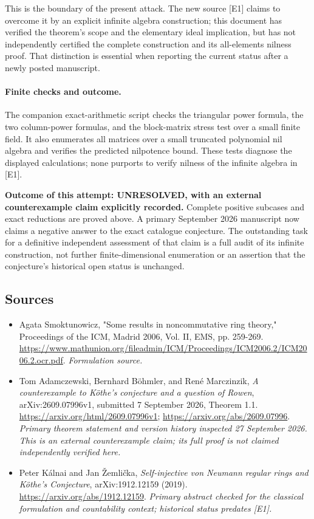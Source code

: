 \documentclass[11pt]{article}
\begin{document}
This is the boundary of the present attack. The new source [E1] claims
to overcome it by an explicit infinite algebra construction; this document
has verified the theorem's scope and the elementary ideal implication,
but has not independently certified the complete construction and its
all-elements nilness proof. That distinction is essential when reporting
the current status after a newly posted manuscript.

\paragraph{Finite checks and outcome.}
The companion exact-arithmetic script checks the triangular power formula,
the two column-power formulas, and the block-matrix stress test over a
small finite field. It also enumerates all matrices over a small truncated
polynomial nil algebra and verifies the predicted nilpotence bound.
These tests diagnose the displayed calculations; none purports to verify
nilness of the infinite algebra in [E1].

\textbf{Outcome of this attempt: UNRESOLVED, with an external counterexample
claim explicitly recorded.} Complete positive subcases and exact reductions
are proved above. A primary September 2026 manuscript now claims a negative
answer to the exact catalogue conjecture. The outstanding task for a
definitive independent assessment of that claim is a full audit of its
infinite construction, not further finite-dimensional enumeration or
an assertion that the conjecture's historical open status is unchanged.


\subsection{Sources}
\begin{itemize}
\item[S1]Agata Smoktunowicz, "Some results in noncommutative ring theory," Proceedings of the ICM, Madrid 2006, Vol. II, EMS, pp. 259-269.
\url{https://www.mathunion.org/fileadmin/ICM/Proceedings/ICM2006.2/ICM2006.2.ocr.pdf}.
\textit{Formulation source.}
\item[E1]Tom Adamczewski, Bernhard B\"ohmler, and Ren\'e Marczinzik,
\emph{A counterexample to K\"othe's conjecture and a question of Rowen},
arXiv:2609.07996v1, submitted 7 September 2026, Theorem 1.1.
\url{https://arxiv.org/html/2609.07996v1};
\url{https://arxiv.org/abs/2609.07996}.
\textit{Primary theorem statement and version history inspected
27 September 2026. This is an external counterexample claim; its full
proof is not claimed independently verified here.}
\item[E2]Peter K\'alnai and Jan \v{Z}emli\v{c}ka,
\emph{Self-injective von Neumann regular rings and K\"othe's Conjecture},
arXiv:1912.12159 (2019).
\url{https://arxiv.org/abs/1912.12159}.
\textit{Primary abstract checked for the classical formulation and
countability context; historical status predates [E1].}

\end{itemize}
\end{document}
